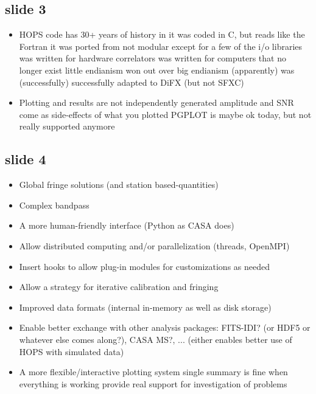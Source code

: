 \subsection{slide 3}
\begin{itemize}
\item HOPS code has 30+ years of history in it
\sbitem was coded in C, but reads like the Fortran it was ported from
\sbitem not modular except for a few of the i/o libraries
\sbitem was written for hardware correlators
\sbitem was written for computers that no longer exist
\sbitem little endianism won out over big endianism (apparently)
\sbitem was (successfully) successfully adapted to DiFX (but not \eg SFXC)
\item Plotting and results are not independently generated
\sbitem amplitude and SNR come as side-effects of what you plotted
\sbitem PGPLOT is maybe ok today, but not really supported anymore
\end{itemize}

\subsection{slide 4}
\begin{itemize}
\item Global fringe solutions (and station based-quantities)
\item Complex bandpass
\item A more human-friendly interface (\eg Python as CASA does)
\item Allow distributed computing and/or parallelization (threads, OpenMPI)
\item Insert hooks to allow plug-in modules for customizations as needed
\item Allow a strategy for iterative calibration and fringing
\item Improved data formats (internal in-memory as well as disk storage)
\item Enable better exchange with other analysis packages:
\sbitem FITS-IDI? (or HDF5 or whatever else comes along?), CASA MS?, ...
\sbitem (either enables better use of HOPS with simulated data)
\item A more flexible/interactive plotting system
\sbitem single summary is fine when everything is working
\sbitem provide real support for investigation of problems
\end{itemize}

